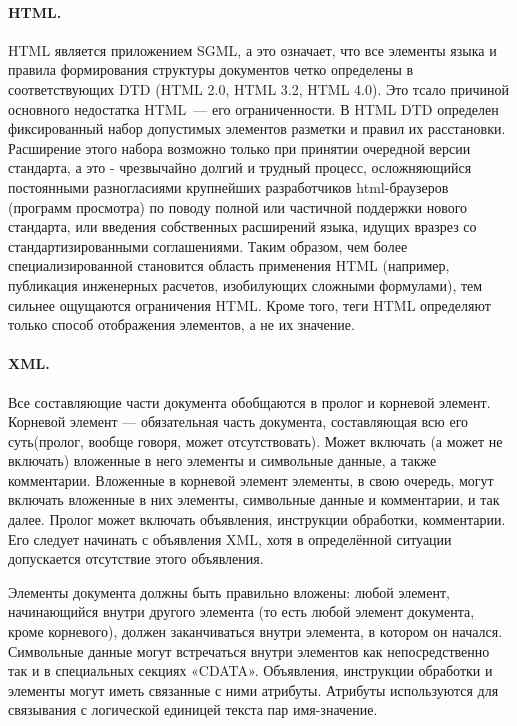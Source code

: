 \documentclass[12pt]{article}
\theoremstyle{definition}
\theoremstyle{remark}
\numberwithin{equation}{section}
\begin{document}
\paragraph{HTML.}
HTML является приложением SGML, а это означает, что все элементы языка и правила формирования структуры документов четко определены в соответствующих DTD (HTML 2.0, HTML 3.2, HTML 4.0). Это тсало причиной основного недостатка HTML~--- его ограниченности. В HTML DTD определен фиксированный набор допустимых элементов разметки и правил их расстановки. Расширение этого набора возможно только при принятии очередной версии стандарта, а это - чрезвычайно долгий и трудный процесс, осложняющийся постоянными разногласиями крупнейших разработчиков html-браузеров (программ просмотра) по поводу полной или частичной поддержки нового стандарта, или введения собственных расширений языка, идущих вразрез со стандартизированными соглашениями. Таким образом, чем более специализированной становится область применения HTML (например, публикация инженерных расчетов, изобилующих сложными формулами), тем сильнее ощущаются ограничения HTML. Кроме того, теги HTML определяют только способ отображения элементов, а не их значение.

\paragraph{XML.} Все составляющие части документа обобщаются в пролог и корневой элемент. Корневой элемент — обязательная часть документа, составляющая всю его суть(пролог, вообще говоря, может отсутствовать). Может включать (а может не включать) вложенные в него элементы и символьные данные, а также комментарии. Вложенные в корневой элемент элементы, в свою очередь, могут включать вложенные в них элементы, символьные данные и комментарии, и так далее. Пролог может включать объявления, инструкции обработки, комментарии. Его следует начинать с объявления XML, хотя в определённой ситуации допускается отсутствие этого объявления.

Элементы документа должны быть правильно вложены: любой элемент, начинающийся внутри другого элемента (то есть любой элемент документа, кроме корневого), должен заканчиваться внутри элемента, в котором он начался. Символьные данные могут встречаться внутри элементов как непосредственно так и в специальных секциях «CDATA». Объявления, инструкции обработки и элементы могут иметь связанные с ними атрибуты. Атрибуты используются для связывания с логической единицей текста пар имя-значение.
\end{document}
